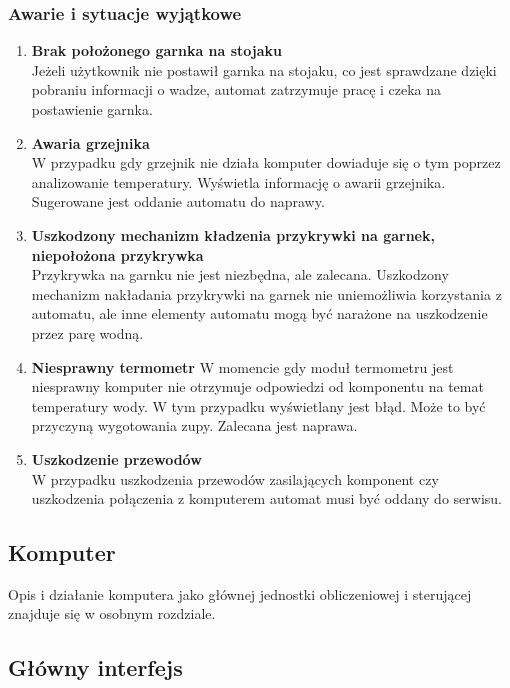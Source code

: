 \documentclass[12pt,a4paper,notitlepage]{article}
\begin{document}
\subsubsection{Awarie i sytuacje wyjątkowe}
\begin{enumerate}
  \item \textbf{Brak położonego garnka na stojaku}\\
Jeżeli użytkownik nie postawił garnka na stojaku, co jest sprawdzane dzięki pobraniu informacji o wadze, automat zatrzymuje pracę i czeka na postawienie garnka.
  \item \textbf{Awaria grzejnika}\\
W przypadku gdy grzejnik nie działa komputer dowiaduje się o tym poprzez analizowanie temperatury. Wyświetla informację o awarii grzejnika. Sugerowane jest oddanie automatu do naprawy.
  \item \textbf{Uszkodzony mechanizm kładzenia przykrywki na garnek, niepołożona przykrywka}\\
Przykrywka na garnku nie jest niezbędna, ale zalecana. Uszkodzony mechanizm nakładania przykrywki na garnek nie uniemożliwia korzystania z automatu, ale inne elementy automatu mogą być narażone na uszkodzenie przez parę wodną.
  \item \textbf{Niesprawny termometr}
W momencie gdy moduł termometru jest niesprawny komputer nie otrzymuje odpowiedzi od komponentu na temat temperatury wody. W tym przypadku wyświetlany jest błąd. Może to być przyczyną wygotowania zupy. Zalecana jest naprawa.
  \item \textbf{Uszkodzenie przewodów}\\
W przypadku uszkodzenia przewodów zasilających komponent czy uszkodzenia połączenia z komputerem automat musi być oddany do serwisu.
\end{enumerate}




\subsection{Komputer}
Opis i działanie komputera jako głównej jednostki obliczeniowej i sterującej znajduje się w osobnym rozdziale.

\subsection{Główny interfejs}
\end{document}
